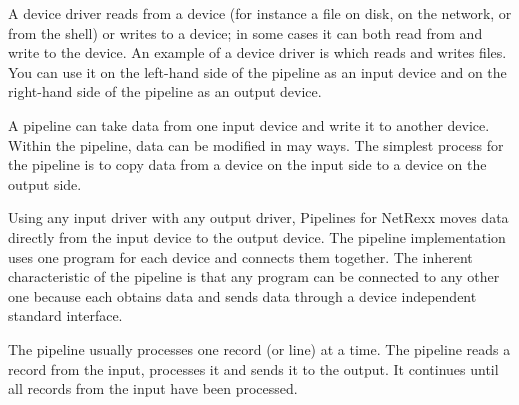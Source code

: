 A device driver reads from a device (for instance a file on disk, on
the network, or from the shell) or writes to a device; in some cases
it can both read from and write to the device. An example of a device
driver is  which reads and writes files. You can use it
on the left-hand side of the pipeline as an input device and on the
right-hand side of the pipeline as an output device.


A pipeline can take data from one input device and write it to another
device. Within the pipeline, data can be modified in may ways.
The simplest process for the pipeline is to copy data from a device on
the input side to a device on the output side. 

Using any input driver with any output driver, Pipelines for NetRexx moves data directly from the input device to the output device. The pipeline implementation uses one program for each device and connects them together.
The inherent characteristic of the pipeline is that any program can be connected to any other one because each obtains data and sends data through a device independent standard interface.

The pipeline usually processes one record (or line) at a time. The pipeline reads a record from the input, processes it and sends it to the output. It continues until all records from the input have been processed.


